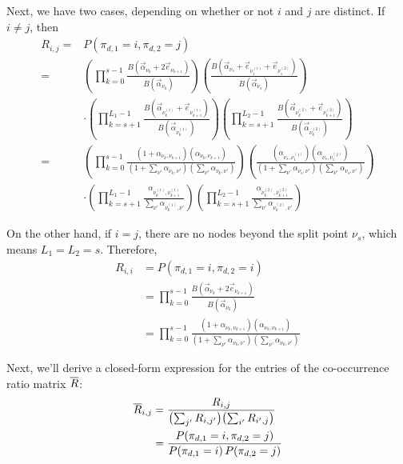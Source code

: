 \documentclass{article}
\theoremstyle{definition}
\begin{document}
Next, we have two cases, depending on whether or not $i$ and $j$ are distinct.
If $i \neq j$, then
\begin{align}
R_{i,j}
={}&P(\pi_{d,1} = i, \pi_{d,2} = j)
\nonumber
\\
={}&
\left(
  \prod_{k=0}^{s-1}
  \frac{B(\vec\alpha_{\nu_k} + 2 \vec e_{\nu_{k+1}})}
       {B(\vec\alpha_{\nu_k})}
\right)
\left(
  \frac{B(\vec\alpha_{\nu_s} + \vec e_{\nu^{(1)}_{1}} + \vec e_{\nu^{(2)}_{1}})}
       {B(\vec\alpha_{\nu_s})}
\right)
\nonumber
\\ & \cdot
\left(
  \prod_{k=s+1}^{L_1-1}
  \frac{B(\vec\alpha_{\nu^{(1)}_{k}} + \vec e_{\nu^{(1)}_{k+1}})}
       {B(\vec\alpha_{\nu^{(1)}_{k}})}
\right)
\left(
  \prod_{k=s+1}^{L_2-1}
  \frac{B(\vec\alpha_{\nu^{(2)}_{k}} + \vec e_{\nu^{(2)}_{k+1}})}
       {B(\vec\alpha_{\nu^{(2)}_{k}})}
\right)
\nonumber
\\
={}&
\left(
  \prod_{k=0}^{s-1}
  \frac{(1 + \alpha_{\nu_k,\nu_{k+1}}) (\alpha_{\nu_k,\nu_{k+1}})}
       {(1 + \sum_{\nu'} \alpha_{\nu_k,\nu'}) (\sum_{\nu'} \alpha_{\nu_k,\nu'})}
\right)
\left(
  \frac{(\alpha_{\nu_s,\nu^{(1)}_{1}}) (\alpha_{\nu_s,\nu^{(2)}_{1}})}
       {(1 + \sum_{\nu'} \alpha_{\nu_s,\nu'}) (\sum_{\nu'} \alpha_{\nu_s,\nu'})}
\right)
\nonumber
\\ & \cdot
\left(
  \prod_{k=s+1}^{L_1-1}
  \frac{\alpha_{\nu^{(1)}_{k}, \nu^{(1)}_{k+1}}}
       {\sum_{\nu'} \alpha_{\nu^{(1)}_{k}, \nu'}}
\right)
\left(
  \prod_{k=s+1}^{L_2-1}
  \frac{\alpha_{\nu^{(2)}_{k}, \nu^{(2)}_{k+1}}}
       {\sum_{\nu'} \alpha_{\nu^{(2)}_{k}, \nu'}}
\right)
\label{eqn:cooccurDistinct}
\end{align}

On the other hand, if $i = j$, there are no nodes beyond the split point $\nu_s$, which means $L_1 = L_2 = s$.
Therefore,
\begin{align}
R_{i,i}
&= P(\pi_{d,1} = i, \pi_{d,2} = i)
\nonumber
\\
&=
  \prod_{k=0}^{s-1}
  \frac{B(\vec\alpha_{\nu_k} + 2 \vec e_{\nu_{k+1}})}
       {B(\vec\alpha_{\nu_k})}
\nonumber
\\
&=
\prod_{k=0}^{s-1}
\frac{(1 + \alpha_{\nu_k,\nu_{k+1}}) (\alpha_{\nu_k,\nu_{k+1}})}
     {(1 + \sum_{\nu'} \alpha_{\nu_k,\nu'}) (\sum_{\nu'} \alpha_{\nu_k,\nu'})}
\label{eqn:cooccurSame}
\end{align}

Next, we'll derive a closed-form expression for the entries of the co-occurrence ratio matrix $\overline{R}$:
\begin{align*}
\overline{R}_{i,j}
&=
\frac{R_{i,j}}{ \bigl( \sum_{j'} R_{i,j'} \bigr) \bigl( \sum_{i'} R_{i',j} \bigr) }
\\
&=
\frac{P(\pi_{d,1} = i, \pi_{d,2} = j)}
     {P(\pi_{d,1} = i) \, P(\pi_{d,2} = j)}
\end{align*}
\end{document}
